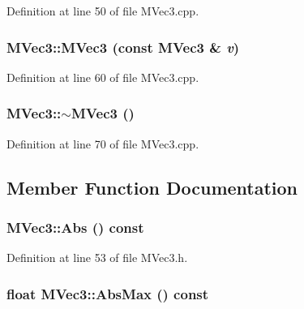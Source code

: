 Definition at line 50 of file MVec3.cpp.\hypertarget{class_m_vec3_acfa4e2533d822d2f8c9e3725011960a}{
\subsubsection[{MVec3}]{\setlength{\rightskip}{0pt plus 5cm}MVec3::MVec3 (const {\bf MVec3} \& {\em v})}}
\label{class_m_vec3_acfa4e2533d822d2f8c9e3725011960a}




Definition at line 60 of file MVec3.cpp.\hypertarget{class_m_vec3_c486b557acdf616a7d95babc21a7cd89}{
\subsubsection[{$\sim$MVec3}]{\setlength{\rightskip}{0pt plus 5cm}MVec3::$\sim$MVec3 ()}}
\label{class_m_vec3_c486b557acdf616a7d95babc21a7cd89}




Definition at line 70 of file MVec3.cpp.

\subsection{Member Function Documentation}
\hypertarget{class_m_vec3_7a6718b309fae2ed8362a365a92f815c}{
\subsubsection[{Abs}]{ MVec3::Abs () const}}
\label{class_m_vec3_7a6718b309fae2ed8362a365a92f815c}




Definition at line 53 of file MVec3.h.\hypertarget{class_m_vec3_cc02bb64689686727d03d6f49948cc06}{
\subsubsection[{AbsMax}]{\setlength{\rightskip}{0pt plus 5cm}float MVec3::AbsMax () const}}
\label{class_m_vec3_cc02bb64689686727d03d6f49948cc06}




